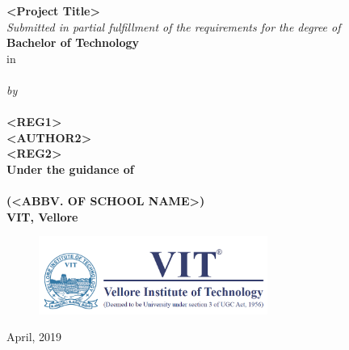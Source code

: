 \documentclass[a4paper,12pt,bibliography=totocnumbered]{report}
\begin{document}
	\begin{titlepage}
		\centering
		\vfill
		{\bfseries\LARGE
			 <Project Title>}\\
		\vspace*{50px}
		\textit{Submitted in partial fulfillment of the requirements for the degree of} \\
		\vspace*{15px}
		{\bfseries \LARGE Bachelor of Technology}\\
		\vspace*{5px}
		in\\
		\vspace*{5px}
		{\bfseries \LARGE <Branch Name in Full>}\\
		\vspace*{50px}
		{\Large \textit{by}}\\
		{\Large \bfseries <AUTHOR1>\\
		<REG1>\\
		<AUTHOR2>\\
		<REG2>\\}
		\vfill
		{\bfseries \LARGE }
		\vfill
		{\bfseries\Large Under the guidance of}\\
		\vspace*{10px}
		{\bfseries \Large <NAME OF GUIDE>}\\
		\vspace*{10px}
		{\bfseries \large <SCHOOL NAME> (<ABBV. OF SCHOOL NAME>)}\\
		\vspace*{10px}
		{\bfseries \large VIT, Vellore}
		\vfill
		\begin{figure}[H]
			\centering
			\includegraphics[width=7.5cm]{vit_logo}
		\end{figure}
		\vfill
		{\Large April, 2019}
	\end{titlepage}
\end{document}
